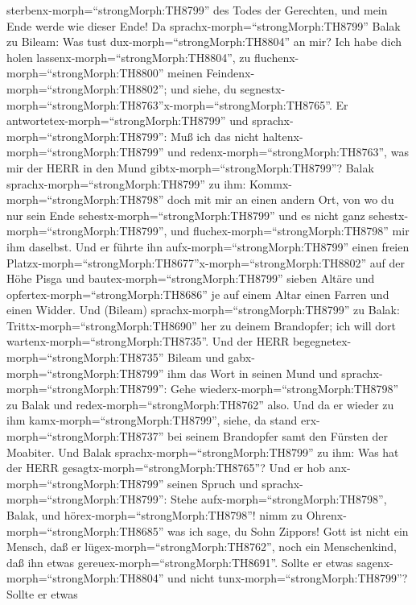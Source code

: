 sterbenx-morph=``strongMorph:TH8799'' des Todes der Gerechten, und mein
Ende werde wie dieser Ende!  Da
sprachx-morph=``strongMorph:TH8799'' Balak zu Bileam: Was tust
dux-morph=``strongMorph:TH8804'' an mir? Ich habe dich holen
lassenx-morph=``strongMorph:TH8804'', zu
fluchenx-morph=``strongMorph:TH8800'' meinen
Feindenx-morph=``strongMorph:TH8802''; und siehe, du
segnestx-morph=``strongMorph:TH8763''x-morph=``strongMorph:TH8765''.
 Er antwortetex-morph=``strongMorph:TH8799'' und
sprachx-morph=``strongMorph:TH8799'': Muß ich das nicht
haltenx-morph=``strongMorph:TH8799'' und
redenx-morph=``strongMorph:TH8763'', was mir der HERR in den Mund
gibtx-morph=``strongMorph:TH8799''?  Balak
sprachx-morph=``strongMorph:TH8799'' zu ihm:
Kommx-morph=``strongMorph:TH8798'' doch mit mir an einen andern Ort, von
wo du nur sein Ende sehestx-morph=``strongMorph:TH8799'' und es nicht
ganz sehestx-morph=``strongMorph:TH8799'', und
fluchex-morph=``strongMorph:TH8798'' mir ihm daselbst.  Und
er führte ihn aufx-morph=``strongMorph:TH8799'' einen freien
Platzx-morph=``strongMorph:TH8677''x-morph=``strongMorph:TH8802'' auf
der Höhe Pisga und bautex-morph=``strongMorph:TH8799'' sieben Altäre und
opfertex-morph=``strongMorph:TH8686'' je auf einem Altar einen Farren
und einen Widder.  Und (Bileam)
sprachx-morph=``strongMorph:TH8799'' zu Balak:
Trittx-morph=``strongMorph:TH8690'' her zu deinem Brandopfer; ich will
dort wartenx-morph=``strongMorph:TH8735''.  Und der HERR
begegnetex-morph=``strongMorph:TH8735'' Bileam und
gabx-morph=``strongMorph:TH8799'' ihm das Wort in seinen Mund und
sprachx-morph=``strongMorph:TH8799'': Gehe
wiederx-morph=``strongMorph:TH8798'' zu Balak und
redex-morph=``strongMorph:TH8762'' also.  Und da er wieder
zu ihm kamx-morph=``strongMorph:TH8799'', siehe, da stand
erx-morph=``strongMorph:TH8737'' bei seinem Brandopfer samt den Fürsten
der Moabiter. Und Balak sprachx-morph=``strongMorph:TH8799'' zu ihm: Was
hat der HERR gesagtx-morph=``strongMorph:TH8765''?  Und er
hob anx-morph=``strongMorph:TH8799'' seinen Spruch und
sprachx-morph=``strongMorph:TH8799'': Stehe
aufx-morph=``strongMorph:TH8798'', Balak, und
hörex-morph=``strongMorph:TH8798''! nimm zu
Ohrenx-morph=``strongMorph:TH8685'' was ich sage, du Sohn Zippors!
 Gott ist nicht ein Mensch, daß er
lügex-morph=``strongMorph:TH8762'', noch ein Menschenkind, daß ihn etwas
gereuex-morph=``strongMorph:TH8691''. Sollte er etwas
sagenx-morph=``strongMorph:TH8804'' und nicht
tunx-morph=``strongMorph:TH8799''? Sollte er etwas
